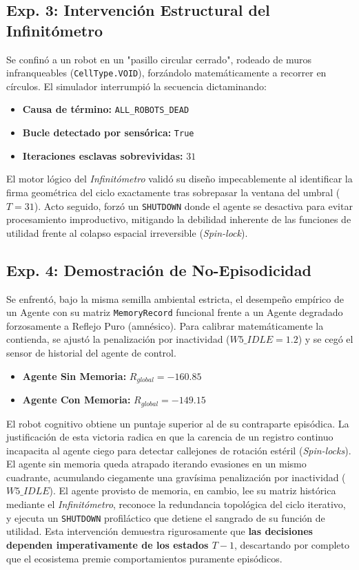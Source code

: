 \documentclass[conference]{IEEEtran}
\begin{document}
\subsection{Exp. 3: Intervención Estructural del Infinitómetro}
Se confinó a un robot en un "pasillo circular cerrado", rodeado de muros infranqueables (\texttt{CellType.VOID}), forzándolo matemáticamente a recorrer en círculos. El simulador interrumpió la secuencia dictaminando:
\begin{itemize}
    \item \textbf{Causa de término:} \texttt{ALL\_ROBOTS\_DEAD}
    \item \textbf{Bucle detectado por sensórica:} \texttt{True}
    \item \textbf{Iteraciones esclavas sobrevividas:} $31$
\end{itemize}
El motor lógico del \textit{Infinitómetro} validó su diseño impecablemente al identificar la firma geométrica del ciclo exactamente tras sobrepasar la ventana del umbral ($T=31$). Acto seguido, forzó un \texttt{SHUTDOWN} donde el agente se desactiva para evitar procesamiento improductivo, mitigando la debilidad inherente de las funciones de utilidad frente al colapso espacial irreversible (\textit{Spin-lock}).

\subsection{Exp. 4: Demostración de No-Episodicidad}
Se enfrentó, bajo la misma semilla ambiental estricta, el desempeño empírico de un Agente con su matriz \texttt{MemoryRecord} funcional frente a un Agente degradado forzosamente a Reflejo Puro (amnésico). Para calibrar matemáticamente la contienda, se ajustó la penalización por inactividad ($W5\_IDLE = 1.2$) y se cegó el sensor de historial del agente de control.
\begin{itemize}
    \item \textbf{Agente Sin Memoria:} $R_{global} = -160.85$
    \item \textbf{Agente Con Memoria:} $R_{global} = -149.15$
\end{itemize}
El robot cognitivo obtiene un puntaje superior al de su contraparte episódica. La justificación de esta victoria radica en que la carencia de un registro continuo incapacita al agente ciego para detectar callejones de rotación estéril (\textit{Spin-locks}). El agente sin memoria queda atrapado iterando evasiones en un mismo cuadrante, acumulando ciegamente una gravísima penalización por inactividad ($W5\_IDLE$). El agente provisto de memoria, en cambio, lee su matriz histórica mediante el \textit{Infinitómetro}, reconoce la redundancia topológica del ciclo iterativo, y ejecuta un \texttt{SHUTDOWN} profiláctico que detiene el sangrado de su función de utilidad. Esta intervención demuestra rigurosamente que \textbf{las decisiones dependen imperativamente de los estados $T-1$}, descartando por completo que el ecosistema premie comportamientos puramente episódicos.
\end{document}
